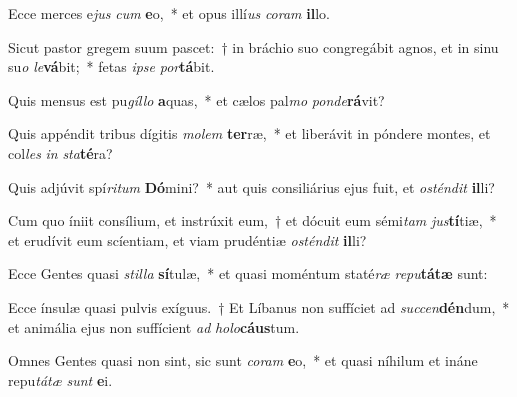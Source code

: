 \item Ecce merces e\textit{jus} \textit{cum} \textbf{e}o,~* et opus illí\textit{us} \textit{co}\textit{ram} \textbf{il}lo.
\item Sicut pastor gregem suum pascet:~† in bráchio suo congregábit agnos, et in sinu su\textit{o} \textit{le}\textbf{vá}bit;~* fetas \textit{ip}\textit{se} \textit{por}\textbf{tá}bit.
\item Quis mensus est pu\textit{gíl}\textit{lo} \textbf{a}quas,~* et cælos pal\textit{mo} \textit{pon}\textit{de}\textbf{rá}vit?
\item Quis appéndit tribus dígitis \textit{mo}\textit{lem} \textbf{ter}ræ,~* et liberávit in póndere montes, et col\textit{les} \textit{in} \textit{sta}\textbf{té}ra?
\item Quis adjúvit spí\textit{ri}\textit{tum} \textbf{Dó}mini?~* aut quis consiliárius ejus fuit, et \textit{os}\textit{tén}\textit{dit} \textbf{il}li?
\item Cum quo íniit consílium, et instrúxit eum,~† et dócuit eum sémi\textit{tam} \textit{jus}\textbf{tí}tiæ,~* et erudívit eum scíentiam, et viam prudéntiæ \textit{os}\textit{tén}\textit{dit} \textbf{il}li?
\item Ecce Gentes quasi \textit{stil}\textit{la} \textbf{sí}tulæ,~* et quasi moméntum staté\textit{ræ} \textit{re}\textit{pu}\textbf{tá}\textbf{tæ} sunt:
\item Ecce ínsulæ quasi pulvis exíguus.~† Et Líbanus non suffíciet ad \textit{suc}\textit{cen}\textbf{dén}dum,~* et animália ejus non suffícient \textit{ad} \textit{ho}\textit{lo}\textbf{cáus}tum.
\item Omnes Gentes quasi non sint, sic sunt \textit{co}\textit{ram} \textbf{e}o,~* et quasi níhilum et ináne repu\textit{tá}\textit{tæ} \textit{sunt} \textbf{e}i.
